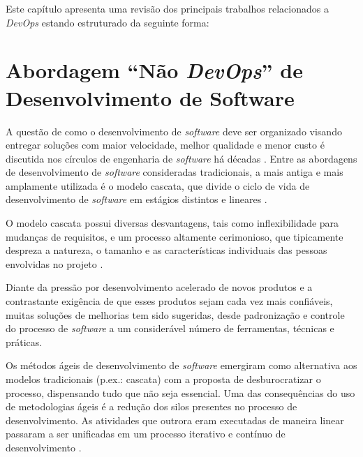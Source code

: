 \newcommand{\texCommand}[1]{\texttt{\textbackslash{#1}}}%

\newcommand{\exemplo}[1]{%
\vspace{\baselineskip}%
\noindent\fbox{\begin{minipage}{\textwidth}#1\end{minipage}}%
\\\vspace{\baselineskip}}%

\newcommand{\exemploVerbatim}[1]{%
\vspace{\baselineskip}%
\noindent\fbox{\begin{minipage}{\textwidth}%
#1\end{minipage}}%
\\\vspace{\baselineskip}}%

Este capítulo apresenta uma revisão dos principais trabalhos relacionados a
\textit{DevOps} estando estruturado da seguinte forma:

\section{Abordagem ``Não \textit{DevOps}'' de Desenvolvimento de Software}

A questão de como o desenvolvimento de \textit{software} deve ser organizado
visando entregar soluções com maior velocidade, melhor qualidade e menor custo
é discutida nos círculos de engenharia de \textit{software} há décadas
\cite{empirical_studies_agile}. Entre as abordagens de desenvolvimento de
\textit{software} consideradas tradicionais, a mais antiga e mais amplamente
utilizada é o modelo cascata, que divide o ciclo de vida de desenvolvimento
de \textit{software} em estágios distintos e lineares
\cite{software_quality_agile}.

O modelo cascata possui diversas desvantagens, tais como inflexibilidade para
mudanças de requisitos, e um processo altamente cerimonioso, que tipicamente
despreza a natureza, o tamanho e as características individuais das pessoas
envolvidas no projeto \cite{software_quality_agile}.

Diante da pressão por desenvolvimento acelerado de novos produtos e a
contrastante exigência de que esses produtos sejam cada vez mais confiáveis,
muitas soluções de melhorias tem sido sugeridas, desde padronização e controle
do processo de \textit{software} a um considerável número de ferramentas,
técnicas e práticas.

Os métodos ágeis de desenvolvimento de \textit{software} emergiram como
alternativa aos modelos tradicionais (p.ex.: cascata) com a proposta de
desburocratizar o processo, dispensando tudo que não seja essencial. Uma das
consequências do uso de metodologias ágeis é a redução dos silos presentes no
processo de desenvolvimento. As atividades que outrora eram executadas de
maneira linear passaram a ser unificadas em um processo iterativo e contínuo
de desenvolvimento \cite{a_decade_of_agile}.

